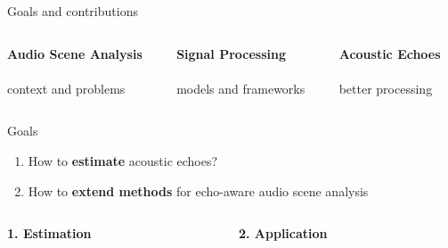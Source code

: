 \begin{frame}{Goals and contributions}

    \begin{columns}[onlytextwidth]
        \begin{column}[T]{0.3\linewidth}
            \centering
            \textbf{Audio Scene Analysis}
            \\\downarrow
            \\context and problems
        \end{column}\hfill\pause
        \begin{column}[T]{0.3\linewidth}
            \centering
            \textbf{Signal Processing}
            \\\downarrow
            \\models and frameworks
        \end{column}\hfill\pause
        \begin{column}[T]{0.3\linewidth}
            \centering
            \textbf{Acoustic Echoes}
            \\\downarrow
            \\better processing
        \end{column}\hfill
    \end{columns}
    \pause

    \vfill
    \begin{mydefblock}{Goals}
        \begin{enumerate}
            \item How to \textbf{estimate} acoustic echoes?
            \item How to \textbf{extend methods} for echo-aware audio scene analysis
        \end{enumerate}
    \end{mydefblock}
    \pause

    \vfill
    \begin{columns}[T,onlytextwidth]
        \begin{column}{0.48\textwidth}
            \centering
            \textbf{1. Estimation}
        \end{column}
        \begin{column}{0.48\textwidth}
            \centering
            \textbf{2. Application}
        \end{column}
    \end{columns}


\end{frame}
